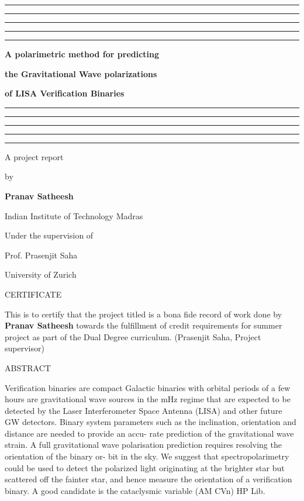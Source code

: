 \documentclass[12pt,a4paper,oneside]{book}
\begin{document}

\baselineskip 20pt




\thispagestyle{empty}
\topskip 15pt
\hrule\hrule\hrule\hrule\hrule
\vskip 20pt
\centerline{\Huge \bf A polarimetric method for predicting } 
\vskip 15pt
\centerline{\Huge \bf  the Gravitational Wave polarizations} 
\vskip 15pt
\centerline{\Huge \bf of LISA Verification Binaries} 
\vskip 20pt
\hrule\hrule\hrule\hrule\hrule
\vskip 30pt
\centerline{\Large A project report}
\vskip 8pt
\centerline{\Large by}
\vskip 8pt
\centerline{\Large \bf Pranav Satheesh}
\vskip 8pt
\centerline{\Large Indian Institute of Technology Madras}
\vskip 140pt
\centerline{\Large Under the supervision of}
\vskip 10pt
\centerline{\Large  Prof. Prasenjit Saha}
\vskip 10pt
\centerline{\Large  University of Zurich}


\newpage\topskip 40pt
\centerline{\Large CERTIFICATE}
\thispagestyle{empty}
\vskip 20pt\noindent 
This is to certify that the project titled {\bf } is a bona fide record of work done by 
{\bf Pranav Satheesh} towards the fulfillment of credit  
requirements for summer project as part of the Dual Degree curriculum.
\vskip 120pt
\hspace{240pt}(Prasenjit Saha, Project supervisor)





\newpage\topskip 40pt
\thispagestyle{empty}
\centerline{\Large ABSTRACT}
\vskip 20pt\noindent 
Verification binaries are compact Galactic binaries with orbital periods of a few hours are gravitational wave sources in the mHz regime that
are expected to be detected by the Laser Interferometer Space Antenna
(LISA) and other future GW detectors. Binary system parameters such
as the inclination, orientation and distance are needed to provide an accu-
rate prediction of the gravitational wave strain. A full gravitational wave
polarisation prediction requires resolving the orientation of the binary or-
bit in the sky. We suggest that spectropolarimetry could be used to detect
the polarized light originating at the brighter star but scattered off the
fainter star, and hence measure the orientation of a verification binary. A
good candidate is the cataclysmic variable (AM CVn) HP Lib.
\end{document}
